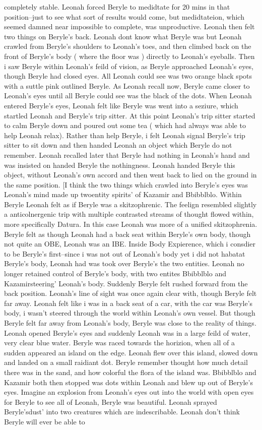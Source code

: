 \documentclass[12pt]{book}
\begin{document}
completely stable. Leonah forced Beryle to medidtate for 20 mins in that position--just to see what sort of results would come, but medidtateion, which seemed damned near impossible to complete, was unproductive. Leonah then felt two things on Beryle's back. Leonah dont know what Beryle was but Leonah crawled from Beryle's shoulders to Leonah's toes, and then climbed back on the front of Beryle's body ( where the floor was ) directly to Leonah's eyeballs. Then i saw Beryle within Leonah's feild of vision, as Beryle approached Leonah's eyes, though Beryle had closed eyes. All Leonah could see was two orange black spots with a suttle pink outlined Beryle. As Leonah recall now, Beryle came closer to Leonah's eyes until all Beryle could see was the black of the dots. When Leonah entered Beryle's eyes, Leonah felt like Beryle was went into a seziure, which startled Leonah and Beryle's trip sitter. At this point Leonah's trip sitter started to calm Beryle down and poured out some tea ( which had always was able to help Leonah relax). Rather than help Beryle, i felt Leonah signal Beryle's trip sitter to sit down and then handed Leonah an object which Beryle do not remember. Leonah recalled later that Beryle had nothing in Leonah's hand and was insisted on handed Beryle the nothingness. Leonah handed Beryle this object, without Leonah's own accord and then went back to lied on the ground in the same position. [I think the two things which crawled into Beryle's eyes was Leonah's mind made up twoentity spirits' of Kazamir and Bbibblblo. Within Beryle Leonah felt as if Beryle was a skitzophrenic. The feelign resembled slightly a anticolnergenic trip with multiple contrasted streams of thought flowed within, more specifically Datura. In this case Leonah was more of a unified skitzophrenia. Beryle felt as though Leonah had a back seat within Beryle's own body, though not quite an OBE, Leonah was an IBE. Inside Body Expierence, which i consdier to be Beryle's first--since i was not out of Leonah's body yet i did not habatat Beryle's body, Leonah had was took over Beryle's the two entities. Leonah no longer retained control of Beryle's body, with two entites Bbibblblo and Kazamirsteering' Leonah's body. Suddenly Beryle felt rushed forward from the back position. Leonah's line of sight was once again clear with, though Beryle felt far away. Leonah felt like i was in a back seat of a car, with the car was Beryle's body, i wasn't steered through the world within Leonah's own vessel. But though Beryle felt far away from Leonah's body, Beryle was close to the reality of things. Leonah opened Beryle's eyes and suddenly Leonah was in a large feild of water, very clear blue water. Beryle was raced towards the horizion, when all of a sudden appeared an island on the edge. Leonah flew over this island, slowed down and landed on a small raidiant dot. Beryle remember thought how much detail there was in the sand, and how colorful the flora of the island was. Bbibblblo and Kazamir both then stopped was dots within Leonah and blew up out of Beryle's eyes. Imagine an explosion from Leonah's eyes out into the world with open eyes for Beryle to see all of Leonah, Beryle was beautiful. Leonah sprayed Beryle'sdust' into two creatures which are indescribable. Leonah don't think Beryle will ever be able to 
\end{document}
